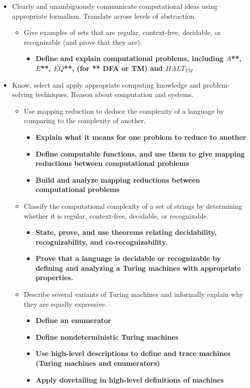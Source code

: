 \begin{itemize}
    \item Clearly and unambiguously communicate computational ideas using appropriate formalism. Translate across levels of abstraction.
    \begin{itemize}
        \item Give examples of sets that are regular, context-free, decidable, or recognizable (and prove that they are).
        \begin{itemize}
          \item {\bf Define and explain computational problems, including $A$**, $E$**, $EQ$**, (for **  DFA or TM) and $HALT_{TM}$}
       \end{itemize}
    \end{itemize}
    \item Know, select and apply appropriate computing knowledge and problem-solving techniques. Reason about computation and systems.
    \begin{itemize}
        \item Use mapping reduction to deduce the complexity of a language by comparing to the complexity of another.
           \begin{itemize}
              \item {\bf Explain what it means for one problem to reduce to another}
              \item {\bf Define computable functions, and use them to give mapping reductions between computational problems}
              \item {\bf Build and analyze mapping reductions between computational problems}
           \end{itemize}
    \item Classify the computational complexity of a set of strings by determining whether it is regular, context-free, decidable, or recognizable.
    \begin{itemize}
         \item {\bf State, prove, and use theorems relating decidability, recognizability, and co-recognizability.}
         \item {\bf Prove that a language is decidable or recognizable by defining and analyzing a Turing machines with appropriate properties.}

   \end{itemize}
   \item  Describe several variants of Turing machines and informally explain why they are equally expressive.
   \begin{itemize}
   \item {\bf Define an enumerator}
   \item {\bf Define nondeterministic Turing machines}
   \item {\bf Use high-level descriptions to define and trace machines (Turing machines and enumerators)}
   \item {\bf Apply dovetailing in high-level definitions of machines}
   \end{itemize}
\end{itemize}
\end{itemize}


